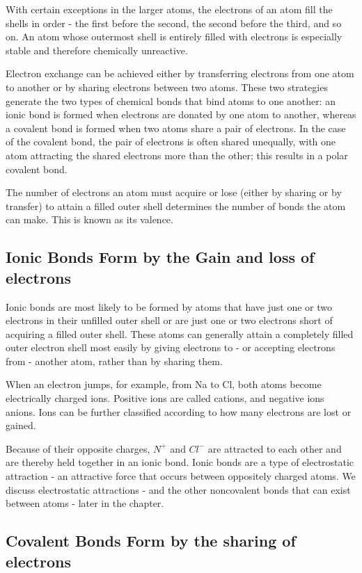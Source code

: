 With certain exceptions in the larger atoms, the electrons of an atom fill
the shells in order - the first before the second, the second before the third,
and so on. An atom whose outermost shell is entirely filled with electrons
is especially stable and therefore chemically unreactive.

Electron exchange can be achieved either by transferring electrons from one
atom to another or by sharing electrons between two atoms. These two strategies generate the two
types of chemical bonds that bind atoms to one another: an ionic bond
is formed when electrons are donated by one atom to another, whereas a
covalent bond is formed when two atoms share a pair of electrons.
In the case of the covalent bond, the pair of electrons is often shared
unequally, with one atom attracting the shared electrons more than the
other; this results in a polar covalent bond.

The number of electrons an atom must acquire or lose (either by sharing or
by transfer) to attain a filled outer shell determines the number of bonds
the atom can make. This is known as its valence.

\subsection{Ionic Bonds Form by the Gain and loss of electrons}

Ionic bonds are most likely to be formed by atoms that have just one or
two electrons in their unfilled outer shell or are just one or two electrons
short of acquiring a filled outer shell. These atoms can generally attain
a completely filled outer electron shell most easily by giving electrons
to - or accepting electrons from - another atom, rather than by sharing
them.

When an electron jumps, for example, from Na to Cl, both atoms become
electrically charged ions.
Positive ions are called cations, and negative ions anions. Ions can be
further classified according to how many electrons are lost or gained.

Because of their opposite charges, $N^{+}$ and $Cl^{-}$ are attracted to each other
and are thereby held together in an ionic bond.
Ionic bonds are a type of electrostatic attraction - an attractive force
that occurs between oppositely charged atoms.
We discuss electrostatic attractions - and the other noncovalent bonds that
can exist between atoms - later in the chapter.

\subsection{Covalent Bonds Form by the sharing of electrons}

